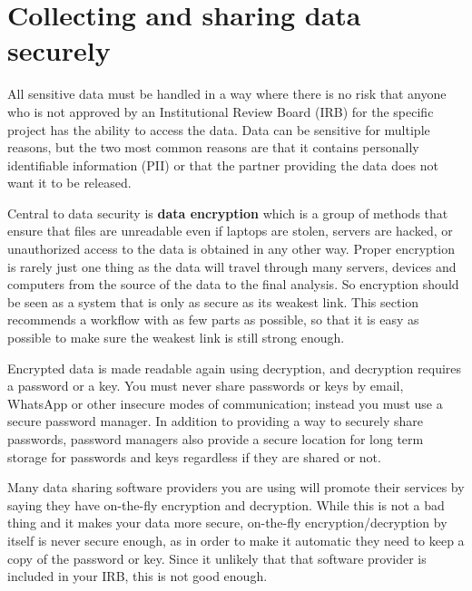 \section{Collecting and sharing data securely}

All sensitive data must be handled in a way where there is no risk that anyone who is 
not approved by an Institutional Review Board (IRB) for the specific project has the 
ability to access the data. Data can be sensitive for multiple reasons, but the two most 
common reasons are that it contains personally identifiable information (PII) 
or that the partner providing the data does not want it to be released. 

Central to data security is \textbf{data encryption} which is a group 
of methods that ensure that files are unreadable even if laptops are stolen, servers
are hacked, or unauthorized access to the data is obtained in any other way. Proper encryption is rarely just one thing as 
the data will travel through many servers, devices and computers from the source of the data
to the final analysis. So encryption should be seen as a system that is only as secure as 
its weakest link. This section recommends a workflow with as few parts as possible, so that
it is easy as possible to make sure the weakest link is still strong enough.

Encrypted data is made readable again using decryption, and decryption requires a password or a key.
You must never share passwords or keys by email, WhatsApp or other insecure modes of communication;
instead you must use a secure password manager. In addition to providing a way to securely share passwords, password 
managers also provide a secure location for long term storage for passwords and keys regardless if 
they are shared or not.

Many data sharing software providers you are using will promote their services by saying they have
on-the-fly encryption and decryption. While this is not a bad thing and it makes your data more secure, 
on-the-fly encryption/decryption by itself is never secure enough, as in order to make it automatic 
they need to keep a copy of the password or key. Since it unlikely that that software provider is 
included in your IRB, this is not good enough.

